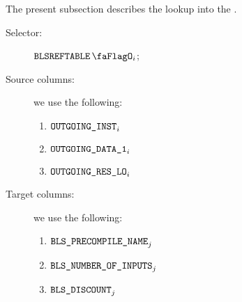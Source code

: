 The present subsection describes the lookup into the \blsRefTableMod{}.
\begin{description}
	\item[Selector:] $\blsRefTableFlag{}_{i}$;
	\item[Source columns:] we use the following:
		\begin{multicols}{3}
			\begin{enumerate}
				\item $\texttt{OUTGOING\_INST}       _{i}$
				\item $\texttt{OUTGOING\_DATA\_1} _{i}$
				\item $\texttt{OUTGOING\_RES\_LO}      _{i}$
			\end{enumerate}
		\end{multicols}
	\item[Target columns:] we use the following:
		\begin{multicols}{3}
			\begin{enumerate}
				\item $\texttt{BLS\_PRECOMPILE\_NAME}        _{j}$
				\item $\texttt{BLS\_NUMBER\_OF\_INPUTS} _{j}$
				\item $\texttt{BLS\_DISCOUNT}       _{j}$
			\end{enumerate}
		\end{multicols}
\end{description}
